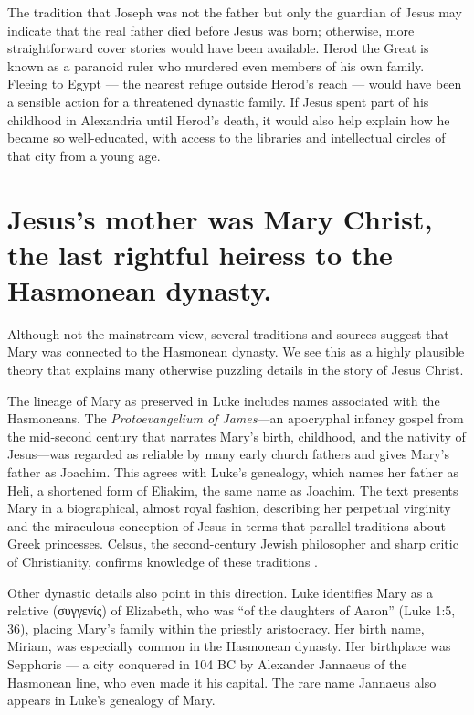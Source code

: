 The tradition that Joseph was not the father but only the guardian of Jesus may indicate that the real father died before Jesus was born; otherwise, more straightforward cover stories would have been available.
Herod the Great is known as a paranoid ruler who murdered even members of his own family.
Fleeing to Egypt --- the nearest refuge outside Herod’s reach --- would have been a sensible action for a threatened dynastic family.
If Jesus spent part of his childhood in Alexandria until Herod’s death, it would also help explain how he became so well-educated, with access to the libraries and intellectual circles of that city from a young age.

\section{Jesus's mother was Mary Christ, the last rightful heiress to the Hasmonean dynasty.}\label{sec:jesuss-mother-was-mary-christ-the-last-rightful-heiress-to-the-hasmonean-dynasty.}

Although not the mainstream view, several traditions and sources suggest that Mary was connected to the Hasmonean dynasty.
We see this as a highly plausible theory that explains many otherwise puzzling details in the story of Jesus Christ.

The lineage of Mary as preserved in Luke includes names associated with the Hasmoneans.
The \textit{Protoevangelium of James}---an apocryphal infancy gospel from the mid-second century that narrates Mary's birth, childhood, and the nativity of Jesus---was regarded as reliable by many early church fathers and gives Mary's father as Joachim.
This agrees with Luke’s genealogy, which names her father as Heli, a shortened form of Eliakim, the same name as Joachim.
The text presents Mary in a biographical, almost royal fashion, describing her perpetual virginity and the miraculous conception of Jesus in terms that parallel traditions about Greek princesses.
Celsus, the second-century Jewish philosopher and sharp critic of Christianity, confirms knowledge of these traditions \cite{origen:contracels}.

Other dynastic details also point in this direction.
Luke identifies Mary as a relative (συγγενίς) of Elizabeth, who was ``of the daughters of Aaron'' (Luke 1:5, 36), placing Mary's family within the priestly aristocracy.
Her birth name, Miriam, was especially common in the Hasmonean dynasty.
Her birthplace was Sepphoris --- a city conquered in 104 BC by Alexander Jannaeus of the Hasmonean line, who even made it his capital.
The rare name Jannaeus also appears in Luke’s genealogy of Mary.


